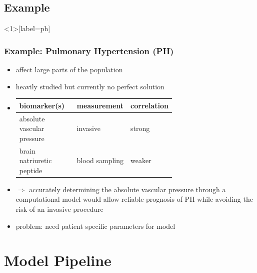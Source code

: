 \documentclass[compress]{beamer}
\begin{document}
\subsection{Example}
\begin{frame}<1>[label=ph]
	\frametitle{Example: Pulmonary Hypertension (PH)}
	\begin{itemize}
		\item<1-> affect large parts of the population
		\item<2-> heavily studied but currently no perfect solution 
		\item<3-> \begin{tabularx}{\linewidth}{| >{\centering\arraybackslash}m{0.4\linewidth} | >{\centering\arraybackslash}m{0.25\linewidth} | >{\centering\arraybackslash}X |} 
				\hline
				biomarker(s) & measurement & correlation \\ 
				\hline
				\hline
				absolute vascular pressure & invasive & strong \\ 
				\hline
				brain natriuretic peptide & blood sampling & weaker \\ 
				\hline
			\end{tabularx}
		\item<4->
			$\Rightarrow$ accurately determining the absolute vascular pressure through a computational model would allow reliable prognosis of PH while avoiding the risk of an invasive procedure
		\item<5-> problem: need patient specific parameters for model
	\end{itemize}
\end{frame}


\section{Model Pipeline}
\end{document}
